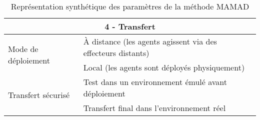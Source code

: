\begin{table}[h!]
\begin{tabular}{|l|p{10cm}|}
        \multicolumn{2}{|c|}{\textbf{4 - Transfert}}                                                                                          \\ \hline
        \multirow{2}{*}{Mode de déploiement}
                                                & À distance (les agents agissent via des effecteurs distants)                                \\
                                                & Local (les agents sont déployés physiquement)                                               \\ \hline
        \multirow{2}{*}{Transfert sécurisé}
                                                & Test dans un environnement émulé avant déploiement                                          \\
                                                & Transfert final dans l'environnement réel                                                   \\ \hline
    \end{tabular}
    \caption{Représentation synthétique des paramètres de la méthode MAMAD}
    \label{tab:mamad_table_configuration}
\end{table}
